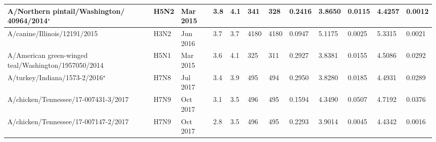 \begin{tabular}{L{1.35in}|L{.35in}|L{.3in}|L{.3in}|L{.3in}|L{.35in}|L{.35in}|L{.35in}|L{.3in}|L{.3in}|L{.3in}|L{.3in}}
 A/Northern  pintail/Washington/ 40964/2014$^{\star}$ &H5N2& Mar  2015 &3.8&4.1&341&328&0.2416&3.8650&0.0115&4.4257&0.0012\\\hline
 A/canine/Illinois/12191/2015 &H3N2& Jun  2016 &3.7&3.7&4180&4180&0.0947&5.1175&0.0025&5.3315&0.0021\\\hline
 A/American  green-winged  teal/Washington/1957050/2014 &H5N1& Mar  2015 &3.6&4.1&325&311&0.2927&3.8381&0.0155&4.5086&0.0292\\\hline
 A/turkey/Indiana/1573-2/2016$^{\star}$ &H7N8& Jul  2017 &3.4&3.9&495&494&0.2950&3.8280&0.0185&4.4931&0.0289\\\hline
 A/chicken/Tennessee/17-007431-3/2017 &H7N9& Oct  2017 &3.1&3.5&496&495&0.1594&4.3490&0.0507&4.7192&0.0376\\\hline
 A/chicken/Tennessee/17-007147-2/2017 &H7N9& Oct  2017 &2.8&3.5&496&495&0.2293&3.9014&0.0045&4.4342&0.0016\\\hline
\end{tabular}
